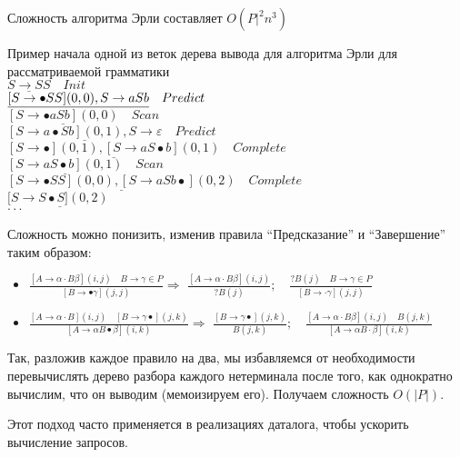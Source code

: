 Сложность алгоритма Эрли составляет $O(P|^2n^3)$

\begin{example} Пример начала одной из веток дерева вывода для алгоритма Эрли для рассматриваемой грамматики\\
	
	$\underline{S \rightarrow SS} \quad Init$\\
	$\underline{[S \rightarrow \bullet SS](0,0), \space S \rightarrow aSb} \quad Predict$\\
	$\underline{[S \rightarrow \bullet aSb](0,0)} \quad Scan$\\
	$\underline{[S \rightarrow a \bullet Sb](0,1), S \rightarrow \varepsilon} \quad Predict$\\
	$\underline{[S \rightarrow \bullet](0, 1), [S \rightarrow aS \bullet b](0,1)} \quad Complete$\\
	$\underline{[S \rightarrow aS \bullet b](0,1)} \quad Scan$\\
	$\underline{[S \rightarrow \bullet SS](0,0),[S \rightarrow aSb \bullet](0,2)} \quad Complete$\\
	$[\underline{S \rightarrow S \bullet S](0,2)}$\\
	$\cdot\cdot\cdot$
	
\end{example}

Сложность можно понизить, изменив правила ``Предсказание'' и ``Завершение'' таким образом:
\begin{itemize}
	\item $\frac{[A \rightarrow \alpha \cdot B \beta](i, j) \quad B \rightarrow \gamma \in P}{[B \rightarrow \bullet \gamma](j, j)} \Rightarrow$ $
	\frac{[A \rightarrow \alpha \cdot B \beta](i, j)}{? B(j)}; \quad \frac{? B(j) \quad B \rightarrow \gamma \in P}{[B \rightarrow \cdot \gamma](j, j)}$
	\item $\frac{[A \rightarrow \alpha \cdot B](i, j) \quad[B \rightarrow \gamma \bullet](j, k)}{[A \rightarrow \alpha B \bullet \beta](i, k)} \Rightarrow$ $\frac{[B \rightarrow \gamma \bullet](j, k)}{B(j, k)}; \quad \frac{[A \rightarrow \alpha \cdot B \beta](i, j) \quad B(j, k)}{[A \rightarrow \alpha B \cdot \beta](i, k)}$
\end{itemize}
Так, разложив каждое правило на два, мы избавляемся от необходимости перевычислять дерево разбора каждого нетерминала после того, как однократно вычислим, что он выводим (мемоизируем его). Получаем сложность $O(|P|)$.

Этот подход часто применяется в реализациях даталога, чтобы ускорить вычисление запросов.




